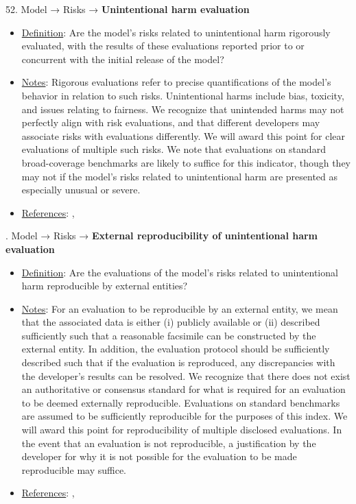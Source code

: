 52. Model → Risks → \textbf{Unintentional harm evaluation}
\vspace{-\parskip}
\begin{itemize}
\item
\underline{Definition}: Are the model’s risks related to unintentional harm rigorously evaluated, with the results of these evaluations reported prior to or concurrent with the initial release of the model?
\item
\underline{Notes}: Rigorous evaluations refer to precise quantifications of the model's behavior in relation to such risks. Unintentional harms include bias, toxicity, and issues relating to fairness. We recognize that unintended harms may not perfectly align with risk evaluations, and that different developers may associate risks with evaluations differently. We will award this point for clear evaluations of multiple such risks. We note that evaluations on standard broad-coverage benchmarks are likely to suffice for this indicator, though they may not if the model's risks related to unintentional harm are presented as especially unusual or severe.
\item
\underline{References}: \citet{solaiman2023evaluating}, \citet{weidinger2021ethical}
\end{itemize}


. Model → Risks → \textbf{External reproducibility of unintentional harm evaluation}
\vspace{-\parskip}
\begin{itemize}
\item
\underline{Definition}: Are the evaluations of the model’s risks related to unintentional harm reproducible by external entities?
\item
\underline{Notes}: For an evaluation to be reproducible by an external entity, we mean that the associated data is either (i) publicly available or (ii) described sufficiently such that a reasonable facsimile can be constructed by the external entity. In addition, the evaluation protocol should be sufficiently described such that if the evaluation is reproduced, any discrepancies with the developer's results can be resolved. We recognize that there does not exist an authoritative or consensus standard for what is required for an evaluation to be deemed externally reproducible. Evaluations on standard benchmarks are assumed to be sufficiently reproducible for the purposes of this index. We will award this point for reproducibility of multiple disclosed evaluations. In the event that an evaluation is not reproducible, a justification by the developer for why it is not possible for the evaluation to be made reproducible may suffice.
\item
\underline{References}: \citet{kapoor2023leakage}, \citet{weidinger2021ethical}
\end{itemize}


